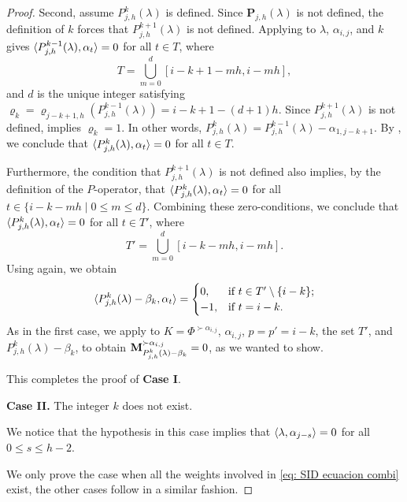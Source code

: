 \begin{proof}
Second, assume $P^{k}_{j,h}(\lambda)$ is defined. 
Since $\mathbf{P}_{j,h}(\lambda)$ is not defined, the definition of $k$ forces  
that $P^{k+1}_{j,h}(\lambda)$ is not defined.
Applying  to $\lambda$, $\alpha_{i,j}$, and $k$ gives $\langle P^{k-1}_{j,h}(\lambda) , \alpha_{t} \rangle = 0$ for all $t\in T$, where
\begin{equation}
    T=\bigcup_{m=0}^{d}[i-k+1-mh,i-mh],
\end{equation}
and $d$ is the unique integer satisfying $\varrho_{k} = \varrho_{j-k+1,h}(P^{k-1}_{j,h}(\lambda)) = i-k+1-(d+1)h$.
Since $P^{k+1}_{j,h}(\lambda)$ is not defined,  implies $\varrho_{k} = 1$. In other words, $P^{k}_{j,h}(\lambda) = P^{k-1}_{j,h}(\lambda) -\alpha_{1,j-k+1}$.
By , we conclude that $\langle P^{k}_{j,h}(\lambda) , \alpha_{t} \rangle=0$ for all $t\in T$.

Furthermore, the condition that $P^{k+1}_{j,h}(\lambda)$ is not defined also implies, by the definition of the $P$-operator, that $\langle P^{k}_{j,h}(\lambda) , \alpha_{t} \rangle =0$ for all $t\in \{i-k-mh\mid 0\leq m\leq d\}$.
Combining these zero-conditions, we conclude that $\langle P^{k}_{j,h}(\lambda) , \alpha_{t} \rangle =0$ for all $t\in T'$, where
\begin{equation}
    T'=\bigcup_{m=0}^{d} [i-k-mh,i-mh].
\end{equation}
Using  again, we obtain
\begin{equation}
    \langle P^{k}_{j,h}(\lambda) - \beta_{k} , \alpha_{t} \rangle = \begin{cases}
            0,&\text{if } t\in T'\setminus \{i-k\};\\
            -1,&\text{if } t = i-k.
    \end{cases}
\end{equation}
As in the first case, we apply  to $K=\Phi^{\succ \alpha_{i,j}}$, $\alpha_{i,j}$, $p=p'=i-k$, the set $T'$, and $P^{k}_{j,h}(\lambda)-\beta_{k}$, to obtain $\mathbf{M}_{P^{k}_{j,h}(\lambda)-\beta_{k}}^{\succ \alpha_{i,j}}=0$, as we wanted to show. 

This completes the proof of \textbf{Case I}.


\bigskip
\textbf{Case II. } The integer $k$ does not exist. 

We notice that the hypothesis in this case implies that   $\langle \lambda , \alpha_{j-s} \rangle=0$ for all $0\leq s \leq h-2$.

We only prove the case when all the weights involved in \eqref{eq: SID ecuacion combi} exist, the other cases follow in a similar fashion. 


\end{proof}
